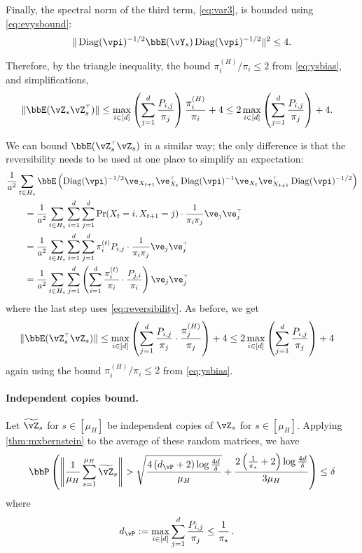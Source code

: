 Finally, the spectral norm of the third term, \cref{eq:var3}, is
bounded using \cref{eq:evysbound}:
\[
  \norm{\Diag(\vpi)^{-1/2} \bbE(\vY_s) \Diag(\vpi)^{-1/2}}^2
  \leq 4
  .
\]

Therefore, by the triangle inequality, the bound $\pi_i^{(H)}/\pi_i
\leq 2$ from \cref{eq:ysbias}, and simplifications, 
\begin{align*}
  \Norm{
    \bbE(\vZ_s \vZ_s^\t)
  }
  &\leq
  \max_{i\in[d]}
  \Parens{ \sum_{j=1}^d \frac{P_{i,j}}{\pi_j} }
  \frac{\pi_i^{(H)}}{\pi_i}
  + 4
  \leq
  2\max_{i\in[d]}
  \Parens{ \sum_{j=1}^d \frac{P_{i,j}}{\pi_j} }
  + 4
  .
\end{align*}

We can bound $\bbE(\vZ_s^\t \vZ_s)$
in a similar way; the only difference is that the reversibility needs
to be used at one place to simplify an expectation:
\begin{align*}
\MoveEqLeft
    \frac1{a^2} \sum_{t \in H_s}
    \bbE\Parens{
      \Diag(\vpi)^{-1/2}
      \ve_{X_{t+1}} \ve_{X_t}^\t
      \Diag(\vpi)^{-1}
      \ve_{X_t}\ve_{X_{t+1}}^\t
      \Diag(\vpi)^{-1/2}
    }
	\\
  & =
  \frac1{a^2} \sum_{t \in H_s}
  \sum_{i=1}^d \sum_{j=1}^d \Pr(X_t = i, X_{t+1} = j) \cdot
  \frac{1}{\pi_i\pi_j} \ve_j\ve_j^\t
  \\
  & =
  \frac1{a^2} \sum_{t \in H_s}
  \sum_{i=1}^d \sum_{j=1}^d \pi_i^{(t)} P_{i,j} \cdot
  \frac{1}{\pi_i\pi_j} \ve_j\ve_j^\t
  \\
  & =
  \frac1{a^2} \sum_{t \in H_s}
  \sum_{j=1}^d \Parens{
    \sum_{i=1}^d \frac{\pi_i^{(t)}}{\pi_i} \cdot \frac{P_{j,i}}{\pi_i}
  } \ve_j\ve_j^\t
\end{align*}
where the last step uses \cref{eq:reversibility}.
As before, we get
\begin{align*}
  \Norm{
    \bbE(\vZ_s^\t\vZ_s)
  }
  &\leq
  \max_{i\in[d]}
  \Parens{
    \sum_{j=1}^d \frac{P_{i,j}}{\pi_j}
    \cdot \frac{\pi_j^{(H)}}{\pi_j}
  }
  + 4
  \leq
  2 \max_{i\in[d]}
  \Parens{
    \sum_{j=1}^d \frac{P_{i,j}}{\pi_j}
  }
  + 4
\end{align*}
again using the bound $\pi_i^{(H)}/\pi_i \leq 2$ from
\cref{eq:ysbias}.

\paragraph{Independent copies bound.}
Let $\wt\vZ_s$ for $s \in [\mu_H]$ be independent copies of
$\vZ_s$ for $s \in [\mu_H]$.
Applying \cref{thm:mxbernstein} to the average of these random
matrices, we have
\begin{equation}
  \bbP\Parens{
    \Norm{ \frac1{\mu_H} \sum_{s=1}^{\mu_H} \wt\vZ_s}
    >
    \sqrt{
      \frac{4\Parens{ d_{\vP} + 2 } \log\frac{4d}{\delta}}
      {\mu_H}
    }
    + \frac{2\Parens{ \frac1{\pimin} + 2 } \log\frac{4d}{\delta}}
    {3\mu_H}
  } \leq \delta
  \label{eq:indpt-bound}
\end{equation}
where
\begin{align*}
  d_{\vP}
  & := \max_{i \in [d]} \sum_{j=1}^d \frac{P_{i,j}}{\pi_j}
  \leq
  \frac{1}{\pimin}
  \,.
\end{align*}

